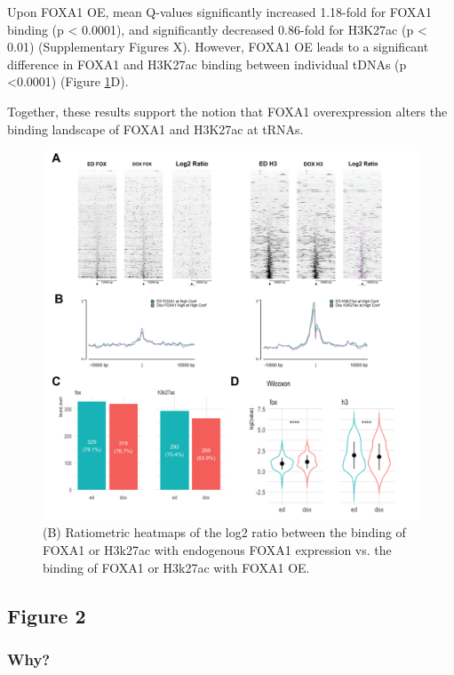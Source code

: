 \documentclass[
  12pt,
]{article}
\begin{document}
Upon FOXA1 OE, mean Q-values significantly increased 1.18-fold for FOXA1 binding (p \textless{} 0.0001), and significantly decreased 0.86-fold for H3K27ac (p \textless{} 0.01) (Supplementary Figures X).
However, FOXA1 OE leads to a significant difference in FOXA1 and H3K27ac binding between individual tDNAs (p \textless0.0001) (Figure \ref{fig:results-1}D).

Together, these results support the notion that FOXA1 overexpression alters the binding landscape of FOXA1 and H3K27ac at tRNAs.

\begin{figure}[H]

{\centering \includegraphics[width=1\linewidth]{../images/results-01} 

}

\caption{(B) Ratiometric heatmaps of the log2 ratio between the binding of FOXA1 or H3k27ac with endogenous FOXA1 expression vs. the binding of FOXA1 or H3k27ac with FOXA1 OE.}\label{fig:results-1}
\end{figure}

\hypertarget{figure-2}{%
\subsection{Figure 2}\label{figure-2}}

\hypertarget{why}{%
\subsubsection{Why?}\label{why}}
\end{document}
